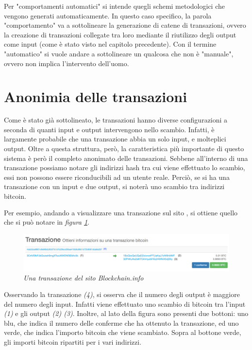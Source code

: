 Per "comportamenti automatici" si intende quegli schemi metodologici che vengono generati automaticamente. In questo caso specifico, la parola "comportamento" va a sottolineare la generazione di catene di transazioni, ovvero la creazione di transazioni collegate tra loro mediante il riutilizzo degli output come input (come è stato visto nel capitolo precedente). Con il termine "automatico" si vuole andare a sottolineare un qualcosa che non è "manuale", ovvero non implica l'intervento dell'uomo.

\section{Anonimia delle transazioni}

Come è stato già sottolineato, le transazioni hanno diverse configurazioni a seconda di quanti input e output intervengono nello scambio. Infatti, è largamente probabile che una transazione abbia un solo input, e molteplici output. Oltre a questa struttura, però, la caratteristica più importante di questo sistema è però il completo anonimato delle transazioni. Sebbene all'interno di una transazione possiamo notare gli indirizzi hash tra cui viene effettuato lo scambio, essi non possono essere riconducibili ad un utente reale. Perciò, se si ha una transazione con un input e due output, si noterà uno scambio tra indirizzi bitcoin. 

Per esempio, andando a visualizzare una transazione sul sito \cite{blockchainInfo}, si ottiene quello che si può notare in \textit{figura \ref{fig:realtx}}.
\begin{figure}[htbp]
	\centering
	\includegraphics[width = \linewidth]{figure/realtx}
	\caption{\textit{Una transazione del sito Blockchain.info} \cite{blockchainInfo} \label{fig:realtx}}
\end{figure}
Osservando la transazione \textit{(4)}, si osserva che il numero degli output è maggiore del numero degli input. Infatti viene effettuato uno scambio di bitcoin tra l'input \textit{(1)} e gli output \textit{(2) (3)}. Inoltre, al lato della figura sono presenti due bottoni: uno blu, che indica il numero delle conferme che ha ottenuto la transazione, ed uno verde, che indica l'importo bitcoin che viene scambiato. Sopra al bottone verde, gli importi bitcoin ripartiti per i vari indirizzi.

